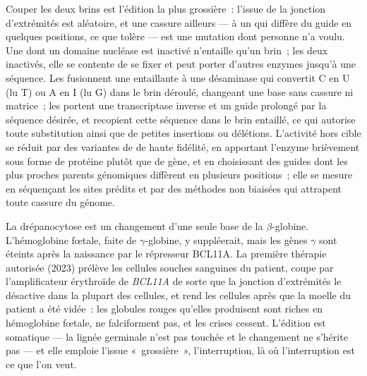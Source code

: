 \begin{proposition}\label{prop:b3:genetic-engineering:editors}
Couper les deux brins est l'édition la plus grossière~: l'issue de la
jonction d'extrémités est aléatoire, et une cassure ailleurs --- à un
\emph{} qui diffère du guide en quelques positions, ce
que  tolère --- est une mutation dont personne n'a voulu. Une 
dont un domaine nucléase est inactivé n'entaille qu'un brin~; les deux
inactivés, elle se contente de se fixer et peut porter d'autres enzymes
jusqu'à une séquence. Les \emph{} fusionnent une 
entaillante à une désaminase qui convertit C en U (lu T) ou A en I (lu
G) dans le brin déroulé, changeant une base sans cassure ni matrice~;
les \emph{} portent une transcriptase inverse et un guide
prolongé par la séquence désirée, et recopient cette séquence dans le
brin entaillé, ce qui autorise toute substitution ainsi que de petites
insertions ou délétions. L'activité hors cible se réduit par des
variantes de  de haute fidélité, en apportant l'enzyme brièvement
sous forme de protéine plutôt que de gène, et en choisissant des guides
dont les plus proches parents génomiques diffèrent en plusieurs
positions~; elle se mesure en séquençant les sites prédits et par des
méthodes non biaisées qui attrapent toute cassure du génome.
\end{proposition}

\begin{example}\label{ex:b3:genetic-engineering:sickle}
La drépanocytose est un changement d'une seule base de la
$\beta$-globine. L'hémoglobine fœtale, faite de $\gamma$-globine, y
suppléerait, mais les gènes $\gamma$ sont éteints après la naissance
par le répresseur BCL11A. La première thérapie  autorisée (2023)
prélève les cellules souches sanguines du patient, coupe par 
l'amplificateur érythroïde de \emph{BCL11A} de sorte que la jonction
d'extrémités le désactive dans la plupart des cellules, et rend les
cellules après que la moelle du patient a été vidée~: les globules
rouges qu'elles produisent sont riches en hémoglobine fœtale, ne
falciforment pas, et les crises cessent. L'édition est somatique --- la
lignée germinale n'est pas touchée et le changement ne s'hérite pas ---
et elle emploie l'issue «~grossière~», l'interruption, là où
l'interruption est ce que l'on veut.
\end{example}

